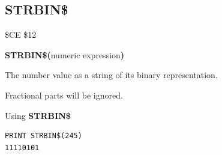 
\newpage
\subsection{STRBIN\$}
\begin{description}[leftmargin=2cm,style=nextline]
\item [Token:]    \$CE \$12

\item [Format:]   {\bf STRBIN\$(}numeric expression{\bf)}

\item [Returns:]  The number value as a string of its binary representation.

\item [Remarks:]  Fractional parts will be ignored.

\item [Example:]  Using {\bf STRBIN\$}

\begin{tcolorbox}[colback=black,coltext=white]
\verbatimfont{\codefont}
\begin{verbatim}
PRINT STRBIN$(245)
11110101
\end{verbatim}
\end{tcolorbox}
\end{description}


\newpage
